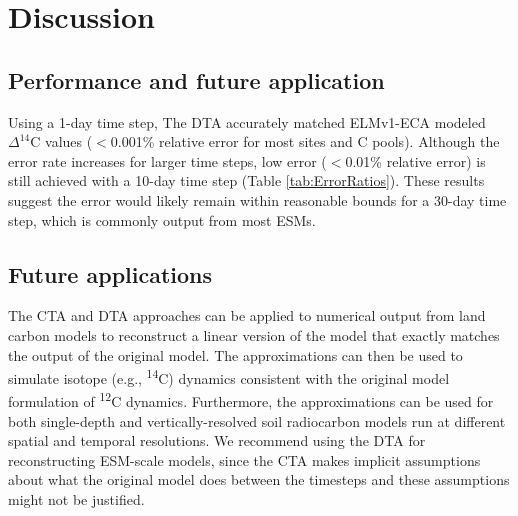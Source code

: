 \documentclass[11pt,a4paper]{article}
\begin{document}
\section{Discussion}

\subsection{Performance and future application}
Using a 1-day time step, The DTA accurately matched ELMv1-ECA modeled $\Delta^{14}$C values ($<$0.001\% relative error for most sites and C pools). Although the error rate increases for larger time steps, low error ($<$0.01\% relative error) is still achieved with a 10-day time step (Table \ref{tab:ErrorRatios}). These results suggest the error would likely remain within reasonable bounds for a 30-day time step, which is commonly output from most ESMs. 

\subsection{Future applications}
The CTA and DTA approaches can be applied to numerical output from land carbon models to reconstruct a linear version of the model that exactly matches the output of the original model. The approximations can then be used to simulate isotope (e.g., \textsuperscript{14}C) dynamics consistent with the original model formulation of \textsuperscript{12}C dynamics. Furthermore, the approximations can be used for both single-depth and vertically-resolved soil radiocarbon models run at different spatial and temporal resolutions. We recommend using the DTA for reconstructing ESM-scale models, since the CTA makes implicit assumptions about what the original model does between the timesteps and these assumptions might not be justified.
\end{document}
